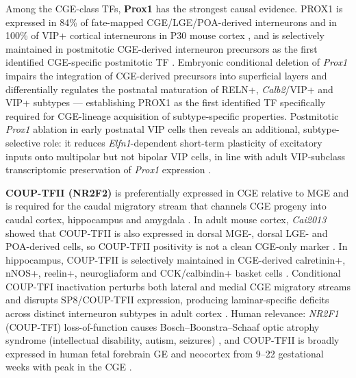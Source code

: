 \documentclass[11pt]{article}
\begin{document}
Among the CGE-class TFs, \textbf{Prox1} has the strongest causal evidence. PROX1 is expressed in 84\% of fate-mapped CGE/LGE/POA-derived interneurons and in 100\% of VIP+ cortical interneurons in P30 mouse cortex \citep{Rubin2013}, and is selectively maintained in postmitotic CGE-derived interneuron precursors as the first identified CGE-specific postmitotic TF \citep{Miyoshi2015}. Embryonic conditional deletion of \textit{Prox1} impairs the integration of CGE-derived precursors into superficial layers and differentially regulates the postnatal maturation of RELN+, \textit{Calb2}/VIP+ and VIP+ subtypes --- establishing PROX1 as the first identified TF specifically required for CGE-lineage acquisition of subtype-specific properties. Postmitotic \textit{Prox1} ablation in early postnatal VIP cells then reveals an additional, subtype-selective role: it reduces \textit{Elfn1}-dependent short-term plasticity of excitatory inputs onto multipolar but not bipolar VIP cells, in line with adult VIP-subclass transcriptomic preservation of \textit{Prox1} expression \citep{Tasic2018, Hodge2019}.

\textbf{COUP-TFII (NR2F2)} is preferentially expressed in CGE relative to MGE and is required for the caudal migratory stream that channels CGE progeny into caudal cortex, hippocampus and amygdala \citep{Kanatani2008}. In adult mouse cortex, \textit{Cai2013} showed that COUP-TFII is also expressed in dorsal MGE-, dorsal LGE- and POA-derived cells, so COUP-TFII positivity is not a clean CGE-only marker \citep{Cai2013}. In hippocampus, COUP-TFII is selectively maintained in CGE-derived calretinin+, nNOS+, reelin+, neurogliaform and CCK/calbindin+ basket cells \citep{Fuentealba2010}. Conditional COUP-TFI inactivation perturbs both lateral and medial CGE migratory streams and disrupts SP8/COUP-TFII expression, producing laminar-specific deficits across distinct interneuron subtypes in adult cortex \citep{Touzot2016}. Human relevance: \textit{NR2F1} (COUP-TFI) loss-of-function causes Bosch--Boonstra--Schaaf optic atrophy syndrome (intellectual disability, autism, seizures) \citep{Yang2017}, and COUP-TFII is broadly expressed in human fetal forebrain GE and neocortex from 9--22 gestational weeks with peak in the CGE \citep{Reinchisi2012}.
\end{document}
